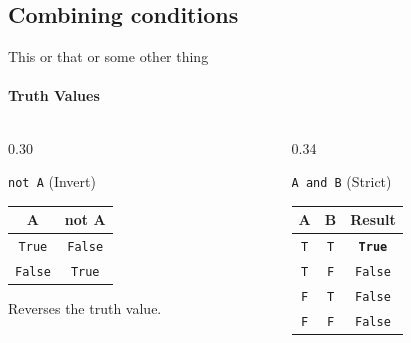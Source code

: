 \documentclass[aspectratio=169,11pt,english]{beamer}
\begin{document}
	\subsection{Combining conditions}
	\begin{frame}{ This or that or some other thing}
		\framesubtitle{Truth Values}
		\begin{columns}[t]
			\begin{column}{0.30\textwidth}
				\begin{block}{\texttt{not A} (Invert)}
					\centering
					\renewcommand{\arraystretch}{1.1}
					\begin{tabular}{|c|c|}
						\hline
						\textbf{A} & \textbf{not A} \\ \hline
						\texttt{True}  & \texttt{False} \\ \hline
						\texttt{False} & \texttt{True}  \\ \hline
					\end{tabular}
					\vspace{0.15cm}
					\footnotesize Reverses the truth value.
				\end{block}
			\end{column}
			
			\begin{column}{0.34\textwidth}
				\begin{block}{\texttt{A and B} (Strict)}
					\centering
					\renewcommand{\arraystretch}{1.1}
					\begin{tabular}{|c|c|c|}
						\hline
						\textbf{A} & \textbf{B} & \textbf{Result} \\ \hline
						\texttt{T} & \texttt{T} & \textbf{\texttt{True}} \\ \hline
						\texttt{T} & \texttt{F} & \texttt{False} \\ \hline
						\texttt{F} & \texttt{T} & \texttt{False} \\ \hline
						\texttt{F} & \texttt{F} & \texttt{False} \\ \hline
					\end{tabular}
					\vspace{0.15cm}
				\end{block}
			\end{column}
			

\end{columns}
\end{frame}
\end{document}
